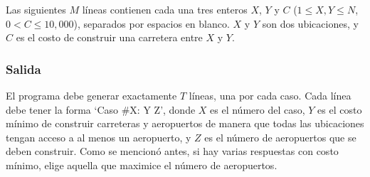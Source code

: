 Las siguientes \(M\) líneas contienen cada una tres enteros \(X\), \(Y\) y \(C\) (\(1 \leq
X, Y \leq N\), \(0 < C \leq 10,000\)), separados por espacios en blanco. \(X\) y \(Y\) son
dos ubicaciones, y \(C\) es el costo de construir una carretera entre \(X\) y \(Y\).

\subsubsection*{Salida}

El programa debe generar exactamente \(T\) líneas, una por cada caso. Cada línea debe
tener la forma ‘Caso \#X: Y Z’, donde \(X\) es el número del caso, \(Y\) es el costo
mínimo de construir carreteras y aeropuertos de manera que todas las ubicaciones tengan
acceso a al menos un aeropuerto, y \(Z\) es el número de aeropuertos que se deben
construir. Como se mencionó antes, si hay varias respuestas con costo mínimo, elige
aquella que maximice el número de aeropuertos.





